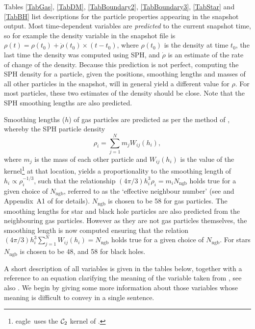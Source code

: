 \documentclass[10pt, a4paper]{article}
\newcommand{\eagle}{{\sc eagle}}
\begin{document}
Tables \ref{TabGas}, \ref{TabDM}, \ref{TabBoundary2}, \ref{TabBoundary3}, \ref{TabStar} and \ref{TabBH} list descriptions for the particle properties appearing in the snapshot output. Most time-dependent variables are {\em predicted} to the current snapshot time, so for example the density variable in the snapshot file is $\rho(t) = \rho(t_0)+\dot\rho(t_0)\times (t-t_0)$, where $\rho(t_0)$ is the density at time $t_0$, the last time the density was computed using SPH, and $\dot\rho$ is an estimate of the rate of change of the density. Because this prediction is not perfect, computing the SPH density for a particle, given the positions, smoothing lengths and masses of all other particles in the snapshot, will in general yield a different value for $\rho$. For most particles, these two estimates of the density should be close. Note that the SPH smoothing lengths are also predicted.

Smoothing lengths ($h$) of gas particles are predicted as per the method of \cite{2013MNRAS.428.2840H}, whereby the SPH particle density
\begin{equation}
\label{EqRho}
\rho_i = \sum_{j=1}^N m_j W_{ij}(h_i),
\end{equation}
where $m_j$ is the mass of each other particle and $W_{ij}(h_i)$ is the value of the kernel\footnote{\eagle\ uses the ${\cal C}_2$ kernel of \cite{Wendland1995}.} at that location, yields a proportionality to the smoothing length of $h_i \propto \rho_i^{-1/3}$, such that the relationship $(4 \pi / 3) h_i^{3} \rho_i = m_i N_{\mathrm{ngb}}$ holds true for a given choice of $N_{\mathrm{ngb}}$, referred to as the `effective neighbour number' (see \cite{2013MNRAS.428.2840H} and Appendix~A1 of \cite{2015MNRAS.446..521S} for details). $N_{\mathrm{ngb}}$ is chosen to be 58 for gas particles. The smoothing lengths for star and black hole particles are also predicted from the neighbouring gas particles. However as they are not gas particles themselves, the smoothing length is now computed ensuring that the relation $(4 \pi / 3) h_i^{3} \sum_{j=1}^N W_{ij}(h_i) = N_{\mathrm{ngb}}$ holds true for a given choice of $N_{\mathrm{ngb}}$. For stars $N_{\mathrm{ngb}}$ is chosen to be 48, and 58 for black holes. 

A short description of all variables is given in the tables below, together with a reference to an equation clarifying the meaning of the variable taken from \cite{2015MNRAS.446..521S}, see also \cite{2016AnC....15...72M}. We begin by giving some more information about those variables whose meaning is difficult to convey in a single sentence.
\end{document}
